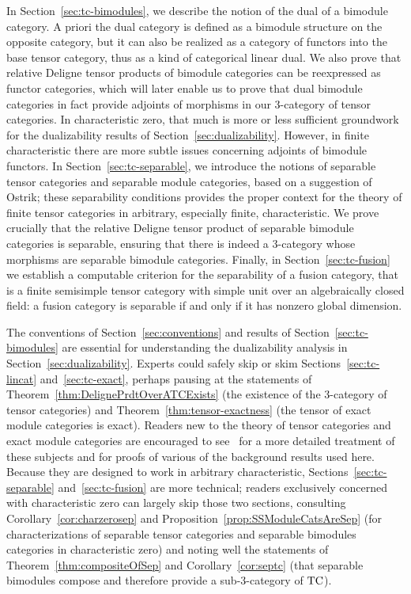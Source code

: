 \documentclass{amsart}
\begin{document}
In Section~\ref{sec:tc-bimodules}, we describe the notion of the dual of a bimodule category.  A priori the dual category is defined as a bimodule structure on the opposite category, but it can also be realized as a category of functors into the base tensor category, thus as a kind of categorical linear dual.  We also prove that relative Deligne tensor products of bimodule categories can be reexpressed as functor categories, which will later enable us to prove that dual bimodule categories in fact provide adjoints of morphisms in our 3-category of tensor categories.  In characteristic zero, that much is more or less sufficient groundwork for the dualizability results of Section~\ref{sec:dualizability}.  However, in finite characteristic there are more subtle issues concerning adjoints of bimodule functors.  In Section~\ref{sec:tc-separable}, we introduce the notions of separable tensor categories and separable module categories, based on a suggestion of Ostrik; these separability conditions provides the proper context for the theory of finite tensor categories in arbitrary, especially finite, characteristic.  We prove crucially that the relative Deligne tensor product of separable bimodule categories is separable, ensuring that there is indeed a 3-category whose morphisms are separable bimodule categories.  Finally, in Section~\ref{sec:tc-fusion} we establish a computable criterion for the separability of a fusion category, that is a finite semisimple tensor category with simple unit over an algebraically closed field: a fusion category is separable if and only if it has nonzero global dimension.

The conventions of Section~\ref{sec:conventions} and results of Section~\ref{sec:tc-bimodules} are essential for understanding the dualizability analysis in Section~\ref{sec:dualizability}.  Experts could safely skip or skim Sections~\ref{sec:tc-lincat} and~\ref{sec:tc-exact}, perhaps pausing at the statements of Theorem~\ref{thm:DelignePrdtOverATCExists} (the existence of the 3-category of tensor categories) and Theorem~\ref{thm:tensor-exactness} (the tensor of exact module categories is exact).  Readers new to the theory of tensor categories and exact module categories are encouraged to see~\cite{BTP} for a more detailed treatment of these subjects and for proofs of various of the background results used here.  Because they are designed to work in arbitrary characteristic, Sections~\ref{sec:tc-separable} and~\ref{sec:tc-fusion} are more technical; readers exclusively concerned with characteristic zero can largely skip those two sections, consulting Corollary~\ref{cor:charzerosep} and Proposition~\ref{prop:SSModuleCatsAreSep} (for characterizations of separable tensor categories and separable bimodules categories in characteristic zero) and noting well the statements of Theorem~\ref{thm:compositeOfSep} and Corollary~\ref{cor:septc} (that separable bimodules compose and therefore provide a sub-3-category of $\mathrm{TC}$).
\end{document}
